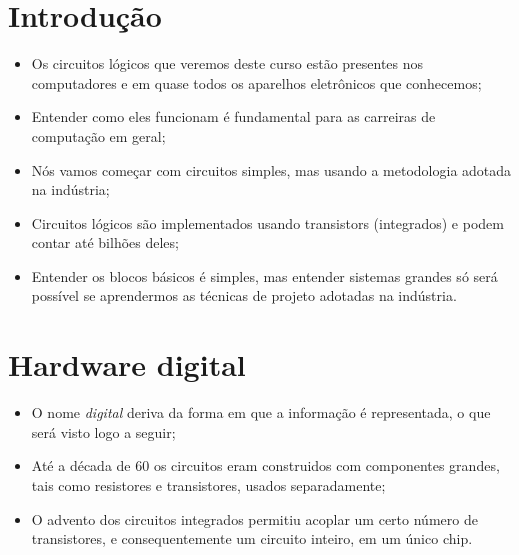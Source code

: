 

\subtitle{Introdução} %



\begin{frame}
	\titlepage
\end{frame} 


\section{Introdução} %

\begin{frame}{\insertsection} 
	\begin{itemize}
		\item Os circuitos lógicos que veremos deste curso estão presentes nos computadores e em quase todos os aparelhos eletrônicos que conhecemos; 
		\item Entender como eles funcionam é fundamental para as carreiras de computação em geral; 
		\item Nós vamos começar com circuitos simples, mas usando a metodologia adotada na indústria;
		\item Circuitos lógicos são implementados usando transistors (integrados) e podem contar até bilhões deles;
		\item Entender os blocos básicos é simples, mas entender sistemas grandes só será possível se aprendermos as técnicas de projeto adotadas na indústria. 
    \end{itemize}
\end{frame}

\section{Hardware digital}

\begin{frame}{\insertsection}
	\begin{itemize}
        \item O nome \textit{digital} deriva da forma em que a informação é representada, o que será visto logo a seguir; 
        \item Até a década de 60 os circuitos eram construidos com componentes grandes, tais como resistores e transistores, usados separadamente; 
        \item O advento dos circuitos integrados permitiu acoplar um certo número de transistores, e consequentemente um circuito inteiro, em um único chip.
    \end{itemize}
\end{frame}

